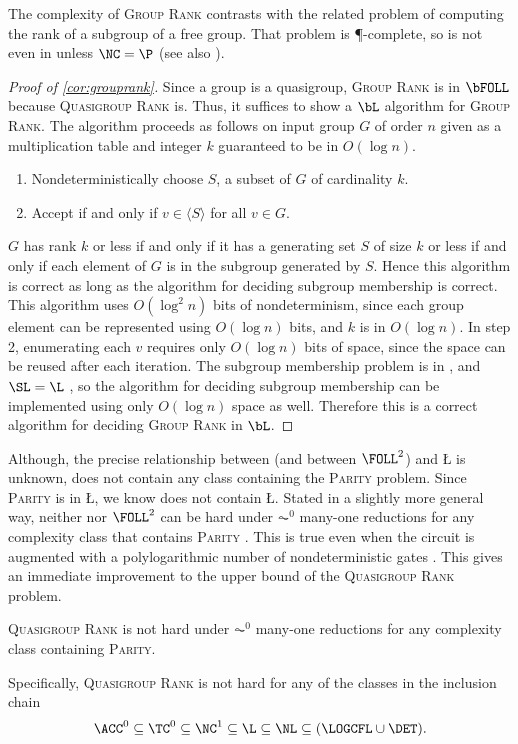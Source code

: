 \documentclass{article}
\begin{document}
The complexity of \textsc{Group Rank} contrasts with the related problem of computing the rank of a subgroup of a free group.
That problem is \P-complete, so is not even in \NC{} unless $\NC = \P$ \autocite[Theorem~4.9]{am84} (see also \autocite[Problem~A.8.11]{ghr95}).

\begin{proof}[Proof of \autoref{cor:grouprank}]
  Since a group is a quasigroup, \textsc{Group Rank} is in $\bFOLL$ because \textsc{Quasigroup Rank} is.
  Thus, it suffices to show a $\bL$ algorithm for \textsc{Group Rank}.
  The algorithm proceeds as follows on input group $G$ of order $n$ given as a multiplication table and integer $k$ guaranteed to be in $O(\log n)$.
  \begin{enumerate}
  \item Nondeterministically choose $S$, a subset of $G$ of cardinality $k$.
  \item Accept if and only if $v \in \langle S \rangle$ for all $v \in G$.
  \end{enumerate}
  $G$ has rank $k$ or less if and only if it has a generating set $S$ of size $k$ or less if and only if each element of $G$ is in the subgroup generated by $S$.
  Hence this algorithm is correct as long as the algorithm for deciding subgroup membership is correct.
  This algorithm uses $O(\log^2 n)$ bits of nondeterminism, since each group element can be represented using $O(\log n)$ bits, and $k$ is in $O(\log n)$.
  In step 2, enumerating each $v$ requires only $O(\log n)$ bits of space, since the space can be reused after each iteration.
  The subgroup membership problem is in \SL{} \cite[Section~3]{bm89}, and $\SL = \L$ \cite{reingold08}, so the algorithm for deciding subgroup membership can be implemented using only $O(\log n)$ space as well.
  Therefore this is a correct algorithm for deciding \textsc{Group Rank} in $\bL$.
\end{proof}

Although, the precise relationship between \FOLL{} (and between $\FOLL^2$) and \L{} is unknown, \FOLL{} does not contain any class containing the \textsc{Parity} problem.
Since \textsc{Parity} is in \L, we know \FOLL{} does not contain \L.
Stated in a slightly more general way, neither \FOLL{} nor $\FOLL^2$ can be hard under $\AC^0$ many-one reductions for any complexity class that contains \textsc{Parity} \cite[Proposition~2.1]{bklm01}.
This is true even when the circuit is augmented with a polylogarithmic number of nondeterministic gates \cite[Section~4]{ctw13}.
This gives an immediate improvement to the upper bound of the \textsc{Quasigroup Rank} problem.

\begin{theorem}
  \textsc{Quasigroup Rank} is not hard under $\AC^0$ many-one reductions for any complexity class containing \textsc{Parity}.
\end{theorem}

Specifically, \textsc{Quasigroup Rank} is not hard for any of the classes in the inclusion chain
$$
\ACC^0 \subseteq \TC^0 \subseteq \NC^1 \subseteq \L \subseteq \NL \subseteq (\LOGCFL \cup \DET).
$$

\printbibliography
\end{document}
